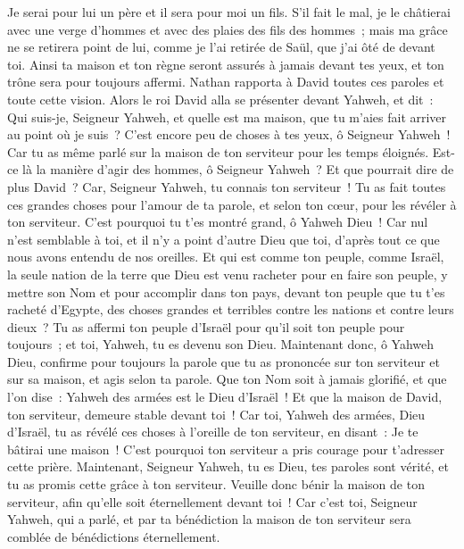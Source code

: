 \begin{multicols}{2}
Je serai pour lui un père et il sera pour moi un fils. S'il fait le mal, je le châtierai avec une verge d'hommes et avec des plaies des fils des hommes~;
mais ma grâce ne se retirera point de lui, comme je l'ai retirée de Saül, que j'ai ôté de devant toi.
Ainsi ta maison et ton règne seront assurés à jamais devant tes yeux, et ton trône sera pour toujours affermi.
Nathan rapporta à David toutes ces paroles et toute cette vision.
Alors le roi David alla se présenter devant Yahweh, et dit~: Qui suis-je, Seigneur Yahweh, et quelle est ma maison, que tu m'aies fait arriver au point où je suis~?
C'est encore peu de choses à tes yeux, ô Seigneur Yahweh~! Car tu as même parlé sur la maison de ton serviteur pour les temps éloignés. Est-ce là la manière d'agir des hommes, ô Seigneur Yahweh~?
Et que pourrait dire de plus David~? Car, Seigneur Yahweh, tu connais ton serviteur~!
Tu as fait toutes ces grandes choses pour l'amour de ta parole, et selon ton cœur, pour les révéler à ton serviteur.
C'est pourquoi tu t'es montré grand, ô Yahweh Dieu~! Car nul n'est semblable à toi, et il n'y a point d'autre Dieu que toi, d'après tout ce que nous avons entendu de nos oreilles.
Et qui est comme ton peuple, comme Israël, la seule nation de la terre que Dieu est venu racheter pour en faire son peuple, y mettre son Nom et pour accomplir dans ton pays, devant ton peuple que tu t'es racheté d'Egypte, des choses grandes et terribles contre les nations et contre leurs dieux~?
Tu as affermi ton peuple d'Israël pour qu'il soit ton peuple pour toujours~; et toi, Yahweh, tu es devenu son Dieu.
Maintenant donc, ô Yahweh Dieu, confirme pour toujours la parole que tu as prononcée sur ton serviteur et sur sa maison, et agis selon ta parole.
Que ton Nom soit à jamais glorifié, et que l'on dise~: Yahweh des armées est le Dieu d'Israël~! Et que la maison de David, ton serviteur, demeure stable devant toi~!
Car toi, Yahweh des armées, Dieu d'Israël, tu as révélé ces choses à l'oreille de ton serviteur, en disant~: Je te bâtirai une maison~! C'est pourquoi ton serviteur a pris courage pour t'adresser cette prière.
Maintenant, Seigneur Yahweh, tu es Dieu, tes paroles sont vérité, et tu as promis cette grâce à ton serviteur.
Veuille donc bénir la maison de ton serviteur, afin qu'elle soit éternellement devant toi~! Car c'est toi, Seigneur Yahweh, qui a parlé, et par ta bénédiction la maison de ton serviteur sera comblée de bénédictions éternellement.

\end{multicols}
